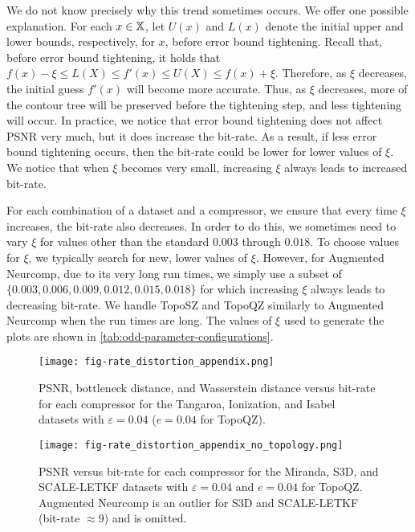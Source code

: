 We do not know precisely why this trend sometimes occurs. We offer one possible explanation. For each $x \in \mathbb{X}$, let $U(x)$ and $L(x)$ denote the initial upper and lower bounds, respectively, for $x$, before error bound tightening. Recall that, before error bound tightening, it holds that $f(x) - \xi \leq L(X) \leq f'(x) \leq U(X) \leq f(x) + \xi$. Therefore, as $\xi$ decreases, the initial guess $f'(x)$ will become more accurate. Thus, as $\xi$ decreases, more of the contour tree will be preserved before the tightening step, and less tightening will occur. In practice, we notice that error bound tightening does not affect PSNR very much, but it does increase the bit-rate. As a result, if less error bound tightening occurs, then the bit-rate could be lower for lower values of $\xi$. We notice that when $\xi$ becomes very small, increasing $\xi$ always leads to increased bit-rate.

For each combination of a dataset and a compressor, we ensure that every time $\xi$ increases, the bit-rate also decreases. In order to do this, we sometimes need to vary $\xi$ for values other than the standard $0.003$ through $0.018$. To choose values for $\xi$, we typically search for new, lower values of $\xi$. However, for Augmented Neurcomp, due to its very long run times, we simply use  a subset of $\{0.003,0.006,0.009,0.012,0.015,0.018\}$ for which increasing $\xi$ always leads to decreasing bit-rate. We handle  TopoSZ and TopoQZ similarly to Augmented Neurcomp when the run times are long. The values of $\xi$ used to generate the plots are shown in \cref{tab:odd-parameter-configurations}.

\begin{figure}[!ht]
\centering
\texttt{[image: fig-rate\_distortion\_appendix.png]}
\vspace{-4mm}
\caption{PSNR, bottleneck distance, and Wasserstein distance versus bit-rate for each compressor for the Tangaroa, Ionization, and Isabel datasets with $\varepsilon = 0.04$ ($e = 0.04$ for TopoQZ).}
\label{fig:reconstruction-quality-appendix}
\vspace{-2mm}
\end{figure}

\begin{figure}[!ht]
\centering
\texttt{[image: fig-rate\_distortion\_appendix\_no\_topology.png]}
\vspace{-4mm}
\caption{PSNR versus bit-rate for each compressor for the Miranda, S3D, and SCALE-LETKF datasets with $\varepsilon = 0.04$ and $e = 0.04$ for TopoQZ. Augmented Neurcomp is an outlier for S3D and SCALE-LETKF (bit-rate $\approx 9$) and is omitted.}
\label{fig:reconstruction-quality-no-topology}
\end{figure}


